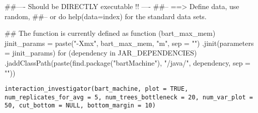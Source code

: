 \documentclass[a4paper]{book}
\begin{document}
%
\begin{Arguments}
\begin{ldescription}
\item[\code{bart\_max\_mem}] 


\end{ldescription}
\end{Arguments}
%
\begin{Examples}
\begin{ExampleCode}
##---- Should be DIRECTLY executable !! ----
##-- ==>  Define data, use random,
##--	or do  help(data=index)  for the standard data sets.

## The function is currently defined as
function (bart_max_mem) 
{
    jinit_params = paste("-Xmx", bart_max_mem, "m", sep = "")
    .jinit(parameters = jinit_params)
    for (dependency in JAR_DEPENDENCIES) {
        .jaddClassPath(paste(find.package("bartMachine"), "/java/", 
            dependency, sep = ""))
    }
  }
\end{ExampleCode}
\end{Examples}
%
\begin{Usage}
\begin{verbatim}
interaction_investigator(bart_machine, plot = TRUE, num_replicates_for_avg = 5, num_trees_bottleneck = 20, num_var_plot = 50, cut_bottom = NULL, bottom_margin = 10)
\end{verbatim}
\end{Usage}
%
\begin{Arguments}
\begin{ldescription}
\item[\code{bart\_machine}] 


\item[\code{plot}] 


\item[\code{num\_replicates\_for\_avg}] 


\item[\code{num\_trees\_bottleneck}] 


\item[\code{num\_var\_plot}] 


\item[\code{cut\_bottom}] 


\item[\code{bottom\_margin}] 


\end{ldescription}
\end{Arguments}
\end{document}
